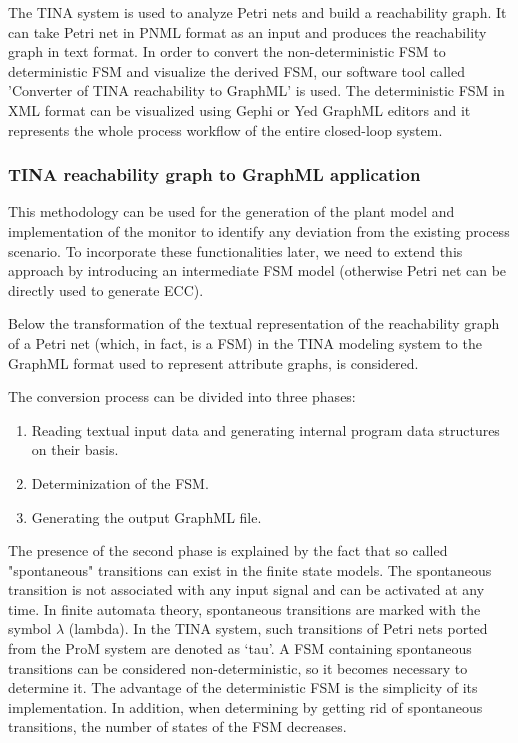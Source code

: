 \documentclass[conference]{IEEEtran}
\begin{document}
The TINA system \cite{berthomieu2004tool} is used to analyze Petri nets and build a reachability graph. It can take Petri net in PNML format as an input and produces the reachability graph in text format. In order to convert the non-deterministic FSM to deterministic FSM and visualize the derived FSM, our software tool called ’Converter of TINA reachability to GraphML’ is used. The deterministic FSM in XML format can be visualized using Gephi \cite{bastian2009gephi} or Yed \cite{wiese2004yfiles} GraphML editors and it represents the whole process workflow of the entire closed-loop system.


\hfill
\subsubsection{TINA reachability graph to GraphML application}
\hfill

\hfill


This methodology can be used for the generation of the plant model and implementation of  the monitor to identify any deviation from the existing process scenario. To incorporate these functionalities later, we need to extend this approach by introducing an  intermediate FSM model (otherwise Petri net can be directly used to generate ECC).

Below the transformation of the textual representation of the reachability graph of a Petri net (which, in fact, is a FSM) in the TINA  modeling system to the GraphML \cite{GraphMLSpec} format used to represent attribute graphs, is considered.

The conversion process can be divided into three phases:

\begin{enumerate}

\item Reading textual input data and generating internal program data structures on their basis. 
\item  Determinization of the FSM.
\item  Generating the output GraphML file.

\end{enumerate}


The presence of the second phase is explained by the fact that so called "spontaneous" transitions can exist in the finite state models. The spontaneous transition is not associated with any input signal and can be activated at any time. In finite automata theory, spontaneous transitions are marked with the symbol $\lambda$ (lambda). In the TINA system, such transitions of Petri nets ported from the ProM system \cite{ProM} are denoted as ‘tau’. A FSM containing spontaneous transitions can be considered non-deterministic, so it becomes necessary to determine it. The advantage of the deterministic FSM is the simplicity of its implementation. In addition, when determining by getting rid of spontaneous transitions, the number of states of the FSM decreases.
\end{document}
